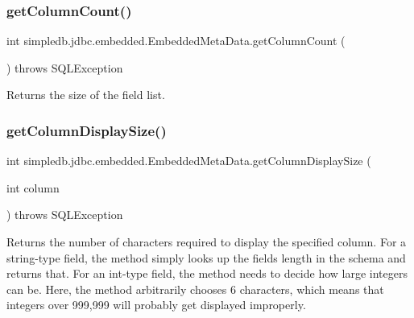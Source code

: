 \subsubsection{\texorpdfstring{get\+Column\+Count()}{getColumnCount()}}
{\footnotesize\ttfamily int simpledb.\+jdbc.\+embedded.\+Embedded\+Meta\+Data.\+get\+Column\+Count (\begin{DoxyParamCaption}{ }\end{DoxyParamCaption}) throws S\+Q\+L\+Exception\hspace{0.3cm}{\ttfamily [inline]}}

Returns the size of the field list. \mbox{\label{classsimpledb_1_1jdbc_1_1embedded_1_1EmbeddedMetaData_a9939060dea7987e5b26535c2db9d503c}} 
\subsubsection{\texorpdfstring{get\+Column\+Display\+Size()}{getColumnDisplaySize()}}
{\footnotesize\ttfamily int simpledb.\+jdbc.\+embedded.\+Embedded\+Meta\+Data.\+get\+Column\+Display\+Size (\begin{DoxyParamCaption}\item[{int}]{column }\end{DoxyParamCaption}) throws S\+Q\+L\+Exception\hspace{0.3cm}{\ttfamily [inline]}}

Returns the number of characters required to display the specified column. For a string-\/type field, the method simply looks up the field\textquotesingle{}s length in the schema and returns that. For an int-\/type field, the method needs to decide how large integers can be. Here, the method arbitrarily chooses 6 characters, which means that integers over 999,999 will probably get displayed improperly. \mbox{\label{classsimpledb_1_1jdbc_1_1embedded_1_1EmbeddedMetaData_a090cf18d364fe42ec078e85745ecd270}} 
